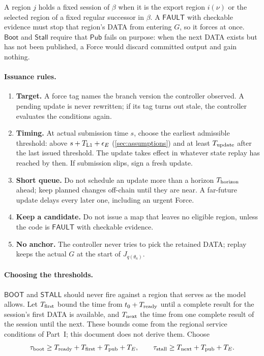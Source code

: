 \documentclass[11pt,a4paper]{article}
\newcommand{\tagg}[1]{\ensuremath{\mathsf{#1}}}
\begin{document}
A region $j$ holds a fixed session of $\beta$ when it is the export
region $i(\nu)$ or the selected region of a fixed regular successor in
$\beta$. A \tagg{FAULT} with checkable evidence must stop that region's
DATA from entering $G$, so it forces at once. $\tagg{Boot}$ and
$\tagg{Stall}$ require that $\tagg{Pub}$ fails on purpose: when the next
DATA exists but has not been published, a Force would discard committed
output and gain nothing.

\paragraph{Issuance rules.}
\begin{enumerate}[label=(R\arabic*)]
\item \textbf{Target.} A force tag names the branch version the
controller observed. A pending update is never rewritten; if its tag
turns out stale, the controller evaluates the conditions again.
\item \textbf{Timing.} At actual submission time $s$, choose the
earliest admissible threshold: above $s+T_{\rm L1}+\epsilon_E$
(\cref{sec:assumptions}) and at least $T_{\rm update}$ after the last
issued threshold. The update takes effect in whatever state replay has
reached by then. If submission slips, sign a fresh update.
\item \textbf{Short queue.} Do not schedule an update more than a
horizon $T_{\rm horizon}$ ahead; keep planned changes off-chain until they are near.
A far-future update delays every later one, including an urgent Force.
\item \textbf{Keep a candidate.} Do not issue a map that leaves no
eligible region, unless the code is \tagg{FAULT} with checkable
evidence.
\item \textbf{No anchor.} The controller never tries to pick the
retained DATA; replay keeps the actual $G$ at the start of
$J_{q(\theta_a)}$.
\end{enumerate}

\paragraph{Choosing the thresholds.}
\tagg{BOOT} and \tagg{STALL} should never fire against a region that
serves as the model allows. Let $T_{\rm first}$ bound the time from
$t_0+T_{\rm ready}$ until a complete result for the session's first DATA
is available, and $T_{\rm next}$ the time from one complete result of
the session until the next. These bounds come from the regional service
conditions of Part~I; this document does not derive them. Choose
\[
 \tau_{\rm boot}\ge T_{\rm ready}+T_{\rm first}+T_{\rm pub}+T_E,
 \qquad
 \tau_{\rm stall}\ge T_{\rm next}+T_{\rm pub}+T_E.
\]
\end{document}
